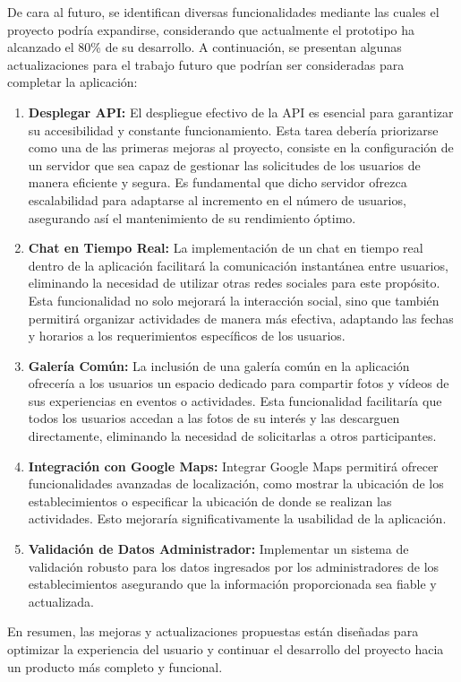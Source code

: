 De cara al futuro, se identifican diversas funcionalidades mediante las cuales el proyecto podría expandirse, considerando que actualmente el prototipo ha alcanzado el 80\% de su desarrollo. A continuación, se presentan algunas actualizaciones para el trabajo futuro que podrían ser consideradas para completar la aplicación:

\begin{enumerate}
    \item \textbf{Desplegar API: }El despliegue efectivo de la API es esencial para garantizar su accesibilidad y constante funcionamiento. Esta tarea debería priorizarse como una de las primeras mejoras al proyecto, consiste en la configuración de un servidor que sea capaz de gestionar las solicitudes de los usuarios de manera eficiente y segura. Es fundamental que dicho servidor ofrezca escalabilidad para adaptarse al incremento en el número de usuarios, asegurando así el mantenimiento de su rendimiento óptimo.
    \item \textbf{Chat en Tiempo Real: }La implementación de un chat en tiempo real dentro de la aplicación facilitará la comunicación instantánea entre usuarios, eliminando la necesidad de utilizar otras redes sociales para este propósito. Esta funcionalidad no solo mejorará la interacción social, sino que también permitirá organizar actividades de manera más efectiva, adaptando las fechas y horarios a los requerimientos específicos de los usuarios.
    \item \textbf{Galería Común: }La inclusión de una galería común en la aplicación ofrecería a los usuarios un espacio dedicado para compartir fotos y vídeos de sus experiencias en eventos o actividades. Esta funcionalidad facilitaría que todos los usuarios accedan a las fotos de su interés y las descarguen directamente, eliminando la necesidad de solicitarlas a otros participantes.
    \item \textbf{Integración con Google Maps: }Integrar Google Maps permitirá ofrecer funcionalidades avanzadas de localización, como mostrar la ubicación de los establecimientos o especificar la ubicación de donde se realizan las actividades. Esto mejoraría significativamente la usabilidad de la aplicación.
    \item \textbf{Validación de Datos Administrador: }Implementar un sistema de validación robusto para los datos ingresados por los administradores de los establecimientos asegurando que la información proporcionada sea fiable y actualizada.
\end{enumerate}

En resumen, las mejoras y actualizaciones propuestas están diseñadas para optimizar la experiencia del usuario y continuar el desarrollo del proyecto hacia un producto más completo y funcional.